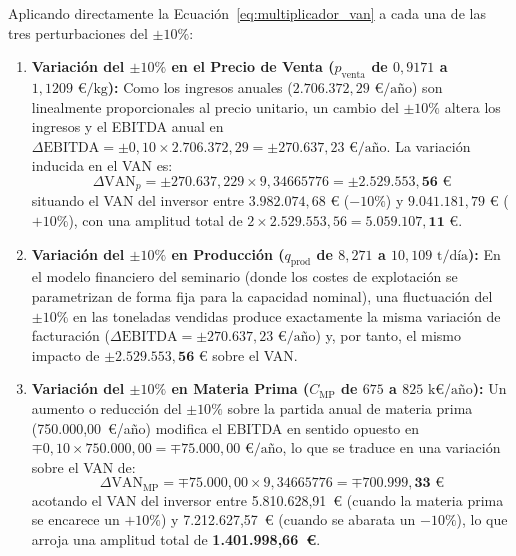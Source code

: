 \documentclass[a4paper,11pt]{report}
\providecommand{\euro}{€}
\begin{document}
Aplicando directamente la Ecuación~\eqref{eq:multiplicador_van} a cada una de las tres perturbaciones del $\pm 10\%$:
\begin{enumerate}
    \item \textbf{Variación del $\pm 10\%$ en el Precio de Venta ($p_{\text{venta}}$ de $0,9171$ a $1,1209\text{ \euro/kg}$):} Como los ingresos anuales ($2.706.372,29\text{ \euro/año}$) son linealmente proporcionales al precio unitario, un cambio del $\pm 10\%$ altera los ingresos y el EBITDA anual en $\Delta\text{EBITDA} = \pm 0,10 \times 2.706.372,29 = \pm 270.637,23\text{ \euro/año}$. La variación inducida en el VAN es:
    \begin{equation}
        \Delta\text{VAN}_{p} = \pm 270.637,229 \times 9,34665776 = \mathbf{\pm 2.529.553,56\text{ \euro}}
    \end{equation}
    situando el VAN del inversor entre $3.982.074,68\text{ \euro}$ ($-10\%$) y $9.041.181,79\text{ \euro}$ ($+10\%$), con una amplitud total de $2 \times 2.529.553,56 = \mathbf{5.059.107,11\text{ \euro}}$.
    \item \textbf{Variación del $\pm 10\%$ en Producción ($q_{\text{prod}}$ de $8,271$ a $10,109\text{ t/día}$):} En el modelo financiero del seminario (donde los costes de explotación se parametrizan de forma fija para la capacidad nominal), una fluctuación del $\pm 10\%$ en las toneladas vendidas produce exactamente la misma variación de facturación ($\Delta\text{EBITDA} = \pm 270.637,23\text{ \euro/año}$) y, por tanto, el mismo impacto de $\mathbf{\pm 2.529.553,56\text{ \euro}}$ sobre el VAN.
    \item \textbf{Variación del $\pm 10\%$ en Materia Prima ($C_{\text{MP}}$ de $675$ a $825\text{ k\euro/año}$):} Un aumento o reducción del $\pm 10\%$ sobre la partida anual de materia prima (750.000,00~\euro/año) modifica el EBITDA en sentido opuesto en $\mp 0,10 \times 750.000,00 = \mp 75.000,00\text{ \euro/año}$, lo que se traduce en una variación sobre el VAN de:
    \begin{equation}
        \Delta\text{VAN}_{\text{MP}} = \mp 75.000,00 \times 9,34665776 = \mathbf{\mp 700.999,33\text{ \euro}}
    \end{equation}
    acotando el VAN del inversor entre 5.810.628,91~\euro{} (cuando la materia prima se encarece un $+10\%$) y 7.212.627,57~\euro{} (cuando se abarata un $-10\%$), lo que arroja una amplitud total de \textbf{1.401.998,66~\euro}.
\end{enumerate}
\end{document}

